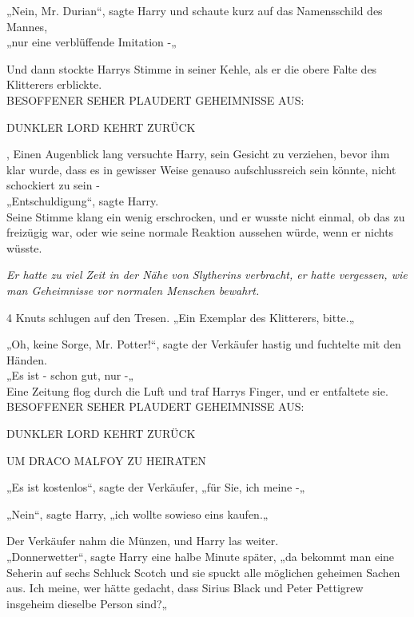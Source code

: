 {„Nein, Mr. Durian“, sagte Harry und schaute kurz auf das Namensschild des Mannes,\\ „nur eine verblüffende Imitation -„

Und dann stockte Harrys Stimme in seiner Kehle, als er die obere Falte des Klitterers erblickte.\\

\hfill\break BESOFFENER SEHER PLAUDERT GEHEIMNISSE AUS:

\hfill\break

DUNKLER LORD KEHRT ZURÜCK

, Einen Augenblick lang versuchte Harry, sein Gesicht zu verziehen, bevor ihm klar wurde, dass es in gewisser Weise genauso aufschlussreich sein könnte, nicht schockiert zu sein -\\ „Entschuldigung“, sagte Harry.\\ Seine Stimme klang ein wenig erschrocken, und er wusste nicht einmal, ob das zu freizügig war, oder wie seine normale Reaktion aussehen würde, wenn er nichts wüsste.

\emph{Er hatte zu viel Zeit in der Nähe von Slytherins verbracht, er hatte vergessen, wie man Geheimnisse vor normalen Menschen bewahrt.}

4 Knuts schlugen auf den Tresen. „Ein Exemplar des Klitterers, bitte.„

„Oh, keine Sorge, Mr. Potter!“, sagte der Verkäufer hastig und fuchtelte mit den Händen.\\ „Es ist - schon gut, nur -„\\ Eine Zeitung flog durch die Luft und traf Harrys Finger, und er entfaltete sie.\\

\hfill\break BESOFFENER SEHER PLAUDERT GEHEIMNISSE AUS:

\hfill\break

DUNKLER LORD KEHRT ZURÜCK

\hfill\break

UM DRACO MALFOY ZU HEIRATEN

„Es ist kostenlos“, sagte der Verkäufer, „für Sie, ich meine -„

„Nein“, sagte Harry, „ich wollte sowieso eins kaufen.„

Der Verkäufer nahm die Münzen, und Harry las weiter.\\ „Donnerwetter“, sagte Harry eine halbe Minute später, „da bekommt man eine Seherin auf sechs Schluck Scotch und sie spuckt alle möglichen geheimen Sachen aus. Ich meine, wer hätte gedacht, dass Sirius Black und Peter Pettigrew insgeheim dieselbe Person sind?„

}
